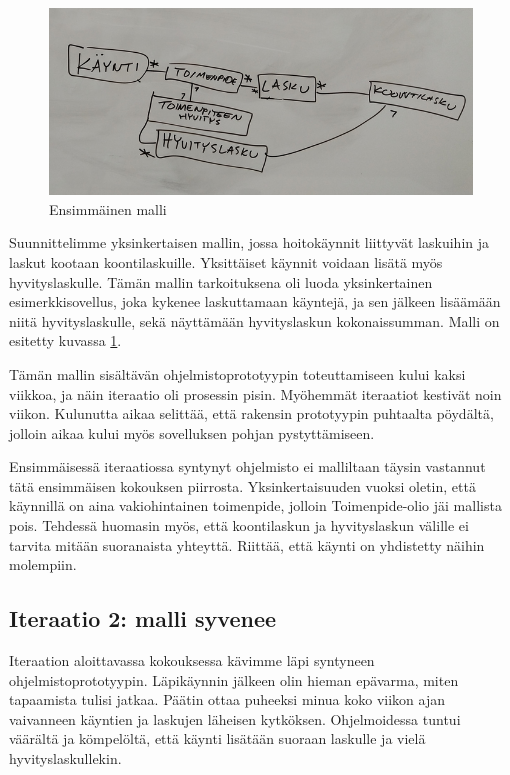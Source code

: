 \begin{figure}
\centering
\includegraphics{illustration/malli1.jpg}
\caption{\label{malli1} Ensimmäinen malli}
\end{figure}

Suunnittelimme yksinkertaisen mallin, jossa hoitokäynnit liittyvät
laskuihin ja laskut kootaan koontilaskuille. Yksittäiset käynnit voidaan
lisätä myös hyvityslaskulle. Tämän mallin tarkoituksena oli luoda
yksinkertainen esimerkkisovellus, joka kykenee laskuttamaan käyntejä, ja
sen jälkeen lisäämään niitä hyvityslaskulle, sekä näyttämään
hyvityslaskun kokonaissumman. Malli on esitetty kuvassa \ref{malli1}.

Tämän mallin sisältävän ohjelmistoprototyypin toteuttamiseen kului kaksi
viikkoa, ja näin iteraatio oli prosessin pisin. Myöhemmät iteraatiot
kestivät noin viikon. Kulunutta aikaa selittää, että rakensin
prototyypin puhtaalta pöydältä, jolloin aikaa kului myös sovelluksen
pohjan pystyttämiseen.

Ensimmäisessä iteraatiossa syntynyt ohjelmisto ei malliltaan täysin
vastannut tätä ensimmäisen kokouksen piirrosta. Yksinkertaisuuden vuoksi
oletin, että käynnillä on aina vakiohintainen toimenpide, jolloin
Toimenpide-olio jäi mallista pois. Tehdessä huomasin myös, että
koontilaskun ja hyvityslaskun välille ei tarvita mitään suoranaista
yhteyttä. Riittää, että käynti on yhdistetty näihin molempiin.

\hypertarget{iteraatio-2-malli-syvenee}{%
\subsection{Iteraatio 2: malli
syvenee}\label{iteraatio-2-malli-syvenee}}

Iteraation aloittavassa kokouksessa kävimme läpi syntyneen
ohjelmistoprototyypin. Läpikäynnin jälkeen olin hieman epävarma, miten
tapaamista tulisi jatkaa. Päätin ottaa puheeksi minua koko viikon ajan
vaivanneen käyntien ja laskujen läheisen kytköksen. Ohjelmoidessa tuntui
väärältä ja kömpelöltä, että käynti lisätään suoraan laskulle ja vielä
hyvityslaskullekin.

